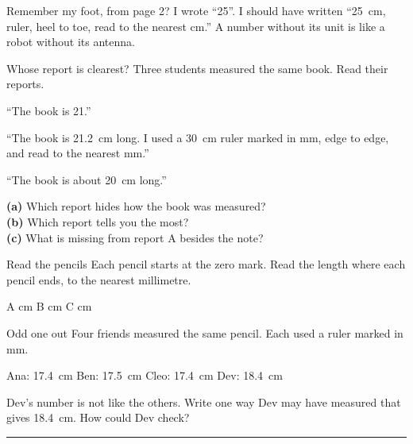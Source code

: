 \begin{multix}[wow]\multixbot[wow]\tcblower
Remember my foot, from page 2? I wrote ``25''. I should have written ``25~cm, ruler, heel to toe, read to the nearest cm.'' A number without its unit is like a robot without its antenna.
\end{multix}

\clearpage

\begin{puzzle}{Whose report is clearest?}
Three students measured the same book. Read their reports.
\begin{description}[leftmargin=1.6em,itemsep=0.25em,style=sameline]
\item[A] ``The book is 21.''
\item[B] ``The book is 21.2~cm long. I used a 30~cm ruler marked in mm, edge to edge, and read to the nearest mm.''
\item[C] ``The book is about 20~cm long.''
\end{description}
\textbf{(a)} Which report hides how the book was measured? \wline[2cm]\\
\textbf{(b)} Which report tells you the most? \wline[2cm]\\
\textbf{(c)} What is missing from report A besides the note? \wline[4cm]
\end{puzzle}

\begin{puzzle}{Read the pencils}
Each pencil starts at the zero mark. Read the length where each pencil ends, to the nearest millimetre.
\begin{center}
\end{center}
A \wline[1.5cm] cm \quad B \wline[1.5cm] cm \quad C \wline[1.5cm] cm
\end{puzzle}

\begin{puzzle}{Odd one out}
Four friends measured the same pencil. Each used a ruler marked in mm.
\begin{center}\sans
Ana: 17.4~cm \quad Ben: 17.5~cm \quad Cleo: 17.4~cm \quad Dev: 18.4~cm
\end{center}
Dev's number is not like the others. Write one way Dev may have measured that gives 18.4~cm. How could Dev check?\\
\rule{\linewidth}{0.5pt}
\end{puzzle}

